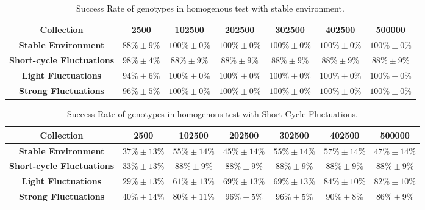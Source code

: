 \begin{table}
\caption{Success Rate of genotypes in homogenous test with stable environment.\label{tab:scstable}}
\scriptsize
\begin{tabular}{ccccccc}
\toprule%
{\textbf{Collection}} & {\textbf{2500}} & \textbf{102500} & \textbf{202500} &\textbf{302500} &\textbf{402500} &\textbf{500000} \tabularnewline
\toprule%
\textbf{Stable Environment} & $88\%\pm9\%$ & $100\%\pm0\%$ & $100\%\pm0\%$ & $100\%\pm0\%$ & $100\%\pm0\%$ & $100\%\pm0\%$\tabularnewline

\textbf{Short-cycle Fluctuations} & $98\%\pm4\%$ & $88\%\pm9\%$ & $88\%\pm9\%$ & $88\%\pm9\%$ & $88\%\pm9\%$ & $88\%\pm9\%$\tabularnewline

\textbf{Light Fluctuations} & $94\%\pm6\%$ & $100\%\pm0\%$ & $100\%\pm0\%$ & $100\%\pm0\%$ & $100\%\pm0\%$ & $100\%\pm0\%$\tabularnewline

\textbf{Strong Fluctuations} & $96\%\pm5\%$ & $100\%\pm0\%$ & $100\%\pm0\%$ & $100\%\pm0\%$ & $100\%\pm0\%$ & $100\%\pm0\%$\tabularnewline

\bottomrule%
\end{tabular}%
\end{table} 

\begin{table}
\caption{Success Rate of genotypes in homogenous test with Short Cycle Fluctuations.\label{tab:scshort}}
\scriptsize
\begin{tabular}{ccccccc}
\toprule%
{\textbf{Collection}} & {\textbf{2500}} & \textbf{102500} & \textbf{202500} &\textbf{302500} &\textbf{402500} &\textbf{500000} \tabularnewline
\toprule%

\textbf{Stable Environment} & $37\%\pm13\%$ & $55\%\pm14\%$ & $45\%\pm14\%$ & $55\%\pm14\%$ & $57\%\pm14\%$ & $47\%\pm14\%$ \tabularnewline
\textbf{Short-cycle Fluctuations} & $33\%\pm13\%$ & $88\%\pm9\%$ & $88\%\pm9\%$ & $88\%\pm9\%$ & $88\%\pm9\%$ & $88\%\pm9\%$ \tabularnewline
\textbf{Light Fluctuations} &$29\%\pm13\%$ & $61\%\pm13\%$ & $69\%\pm13\%$ & $69\%\pm13\%$ & $84\%\pm10\%$ & $82\%\pm10\%$ \tabularnewline
\textbf{Strong Fluctuations} &$40\%\pm14\%$ & $80\%\pm11\%$ & $96\%\pm5\%$ & $96\%\pm5\%$ & $90\%\pm8\%$ & $86\%\pm9\%$\tabularnewline

\bottomrule%
\end{tabular}%
\end{table} 


